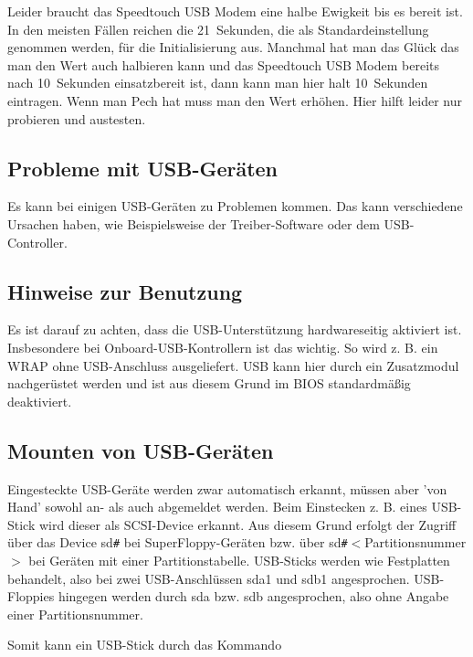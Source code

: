 \begin{description}
        Leider braucht das Speedtouch USB Modem eine halbe 
        Ewigkeit bis es bereit ist. In den meisten Fällen reichen 
        die 21~Sekunden, die als Standardeinstellung genommen werden, 
        für die Initialisierung aus. Manchmal hat man
        das Glück das man den Wert auch halbieren kann und das
        Speedtouch USB Modem bereits nach 10~Sekunden einsatzbereit ist, dann
        kann man hier halt 10~Sekunden eintragen. Wenn man Pech hat
        muss man den Wert erhöhen. Hier hilft leider nur probieren und
        austesten.

\end{description}

\subsection{Probleme mit USB-Geräten}

Es kann bei einigen USB-Geräten zu Problemen kommen. Das kann verschiedene
Ursachen haben, wie Beispielsweise der Treiber-Software oder dem
USB-Controller.

\subsection{Hinweise zur Benutzung}

Es ist darauf zu achten, dass die USB-Unterstützung hardwareseitig aktiviert 
ist. Insbesondere bei Onboard-USB-Kontrollern ist das wichtig. So wird z. B. 
ein WRAP ohne USB-Anschluss ausgeliefert. USB kann hier durch ein Zusatzmodul 
nachgerüstet werden und ist aus diesem Grund im BIOS standardmäßig deaktiviert. 


\subsection{Mounten von USB-Geräten}

Eingesteckte USB-Geräte werden zwar automatisch erkannt, müssen aber 'von Hand' 
sowohl an- als auch abgemeldet werden. Beim Einstecken z. B. eines USB-Stick 
wird dieser als SCSI-Device erkannt. Aus diesem Grund erfolgt der Zugriff über 
das Device sd\verb=#= bei SuperFloppy-Geräten bzw. über sd\verb=#=$<$Partitionsnummer$>$ bei
Geräten mit einer Partitionstabelle. USB-Sticks werden wie Festplatten 
behandelt, also bei zwei USB-Anschlüssen sda1 und sdb1 angesprochen. 
USB-Floppies hingegen werden durch sda bzw. sdb angesprochen, also ohne Angabe
einer Partitionsnummer.

Somit kann ein USB-Stick durch das Kommando

